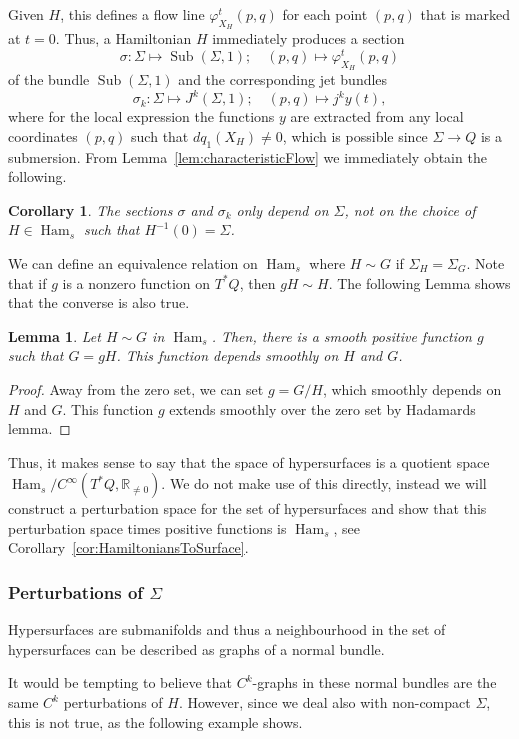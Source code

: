 \documentclass{amsart}
\newcommand{\RR}{\mathbb{R}}
\newcommand{\Ham}{\operatorname{Ham}}
\newcommand{\Sub}{\operatorname{Sub}}
\newtheorem{lemma}[proposition]{Lemma}
\newtheorem{corollary}[theorem]{Corollary}
\theoremstyle{definition}
\theoremstyle{remark}
\numberwithin{equation}{section}
\begin{document}
Given $H$, this defines a flow line $\varphi^t_{X_H}(p,q)$ for each point $(p,q)$ that is marked at $t=0$. Thus, a Hamiltonian $H$ immediately produces a section
$$\sigma:\Sigma\mapsto \Sub(\Sigma,1);\quad (p,q)\mapsto \varphi^t_{X_H}(p,q)$$
of the bundle $\Sub(\Sigma,1)$ and the corresponding jet bundles
$$\sigma_k:\Sigma\mapsto J^k(\Sigma,1);\quad (p,q)\mapsto j^ky(t),$$
where for the local expression the functions $y$ are extracted from any local coordinates $(p,q)$ such that $dq_1(X_H)\neq 0$, which is possible since $\Sigma\to Q$ is a submersion. From Lemma~\ref{lem:characteristicFlow} we immediately obtain the following.
\begin{corollary}
    The sections $\sigma$ and $\sigma_k$ only depend on $\Sigma$, not on the choice of $H\in \Ham_s$ such that $H^{-1}(0)=\Sigma$.
\end{corollary}

We can define an equivalence relation on $\Ham_s$ where $H\sim G$ if $\Sigma_H=\Sigma_G$. Note that if $g$ is a nonzero function on $T^*Q$, then $gH\sim H$. The following Lemma shows that the converse is also true.
\begin{lemma}\label{lem:Hadamard}
    Let $H\sim G$ in $\Ham_s$. Then, there is a smooth positive function $g$ such that $G=gH$. This function depends smoothly on $H$ and $G$.
\end{lemma}
\begin{proof}
    Away from the zero set, we can set $g=G/H$, which smoothly depends on $H$ and $G$. This function $g$ extends smoothly over the zero set by Hadamards lemma.
\end{proof}
Thus, it makes sense to say that the space of hypersurfaces is a quotient space $\Ham_s/C^\infty(T^*Q,\RR_{\neq 0})$. We do not make use of this directly, instead we will construct a perturbation space for the set of hypersurfaces and show that this perturbation space times positive functions is $\Ham_s$, see Corollary~\ref{cor:HamiltoniansToSurface}.


\subsubsection{Perturbations of $\Sigma$}\label{subsubsec:perturbSigma}
Hypersurfaces are submanifolds and thus a neighbourhood in the set of hypersurfaces can be described as graphs of a normal bundle.

It would be tempting to believe that $C^k$-graphs in these normal bundles are the same $C^k$ perturbations of $H$. However, since we deal also with non-compact $\Sigma$, this is not true, as the following example shows. 
\end{document}
